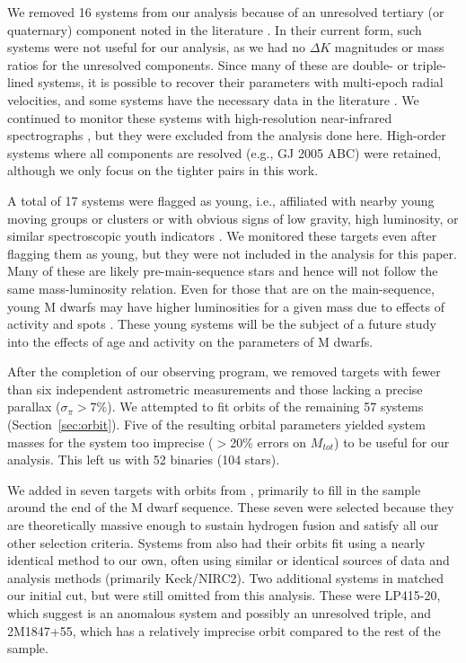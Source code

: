 \documentclass[twocolumn]{aastex62}
\begin{document}
We removed 16 systems from our analysis because of an unresolved tertiary (or quaternary) component noted in the literature \citep[e.g.,][]{2010ApJ...720.1727L,2002A&A...382..118T,2018ApJS..235....6T}. In their current form, such systems were not useful for our analysis, as we had no $\Delta K$ magnitudes or mass ratios for the unresolved components. Since many of these are double- or triple-lined systems, it is possible to recover their parameters with multi-epoch radial velocities, and some systems have the necessary data in the literature \citep[e.g.,][]{Sgr2000}. We continued to monitor these systems with high-resolution near-infrared spectrographs \citep{2010SPIE.7735E..1MY, 2012SPIE.8446E..2CR, Park2014}, but they were excluded from the analysis done here. High-order systems where all components are resolved (e.g., GJ 2005 ABC) were retained, although we only focus on the tighter pairs in this work. 

A total of 17 systems were flagged as young, i.e., affiliated with nearby young moving groups or clusters or with obvious signs of low gravity, high luminosity, or similar spectroscopic youth indicators \citep{Shkolnik2012, Kraus2014, Gagne2014, Malo2014a, Gagne2015, 2017AJ....153...95R, 2017AJ....154...69S, Rizzuto2017, 2018MNRAS.475.2955L}. We monitored these targets even after flagging them as young, but they were not included in the analysis for this paper. Many of these are likely pre-main-sequence stars and hence will not follow the same mass-luminosity relation. Even for those that are on the main-sequence, young M dwarfs may have higher luminosities for a given mass due to effects of activity and spots \citep[e.g.,][]{2015ApJ...807....3K,Stassun2012,Somers2017}. These young systems will be the subject of a future study into the effects of age and activity on the parameters of M dwarfs. 

After the completion of our observing program, we removed targets with fewer than six independent astrometric measurements and those lacking a precise parallax ($\sigma_{\pi}>7\%$). We attempted to fit orbits of the remaining 57 systems (Section~\ref{sec:orbit}). Five of the resulting orbital parameters yielded system masses for the system too imprecise ($>$20\% errors on $M_{tot}$) to be useful for our analysis. This left us with 52 binaries (104 stars).

We added in seven targets with orbits from \citet{Dupuy2017}, primarily to fill in the sample around the end of the M dwarf sequence. These seven were selected because they are theoretically massive enough to sustain hydrogen fusion and satisfy all our other selection criteria. Systems from \citet{Dupuy2017} also had their orbits fit using a nearly identical method to our own, often using similar or identical sources of data and analysis methods (primarily Keck/NIRC2). Two additional systems in \citet{Dupuy2017} matched our initial cut, but were still omitted from this analysis. These were LP415-20, which \citet{Dupuy2017} suggest is an anomalous system and possibly an unresolved triple, and 2M1847+55, which has a relatively imprecise orbit compared to the rest of the sample.
\end{document}
